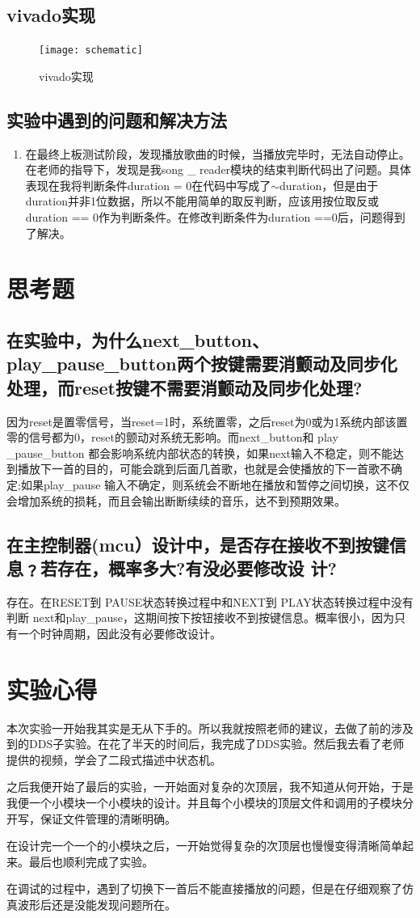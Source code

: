 \documentclass{../source/Experiment}
\begin{document}
        \subsection{vivado实现}
            \begin{figure}[H]
                \centering
                \texttt{[image: schematic]}
                \caption{vivado实现}
            \end{figure}
        \subsection{实验中遇到的问题和解决方法}
            \begin{enumerate}
                \item 在最终上板测试阶段，发现播放歌曲的时候，当播放完毕时，无法自动停止。在老师的指导下，发现是我song \_ reader模块的结束判断代码出了问题。具体表现在我将判断条件duration = 0在代码中写成了$\sim$duration，但是由于duration并非1位数据，所以不能用简单的取反判断，应该用按位取反或duration == 0作为判断条件。在修改判断条件为duration ==0后，问题得到了解决。
            \end{enumerate}
    \section{思考题}
        \subsection{在实验中，为什么next\_button、play\_pause\_button两个按键需要消颤动及同步化处理，而reset按键不需要消颤动及同步化处理?}
        因为reset是置零信号，当reset=1时，系统置零，之后reset为0或为1系统内部该置零的信号都为0，reset的颤动对系统无影响。而next\_button和 play \_pause\_button 都会影响系统内部状态的转换，如果next输入不稳定，则不能达到播放下一首的目的，可能会跳到后面几首歌，也就是会使播放的下一首歌不确定;如果play\_pause 输入不确定，则系统会不断地在播放和暂停之间切换，这不仅会增加系统的损耗，而且会输出断断续续的音乐，达不到预期效果。
        \subsection{在主控制器(mcu）设计中，是否存在接收不到按键信息﹖若存在，概率多大?有没必要修改设
        计?}
        存在。在RESET到 PAUSE状态转换过程中和NEXT到 PLAY状态转换过程中没有判断 next和play\_pause，这期间按下按钮接收不到按键信息。概率很小，因为只有一个时钟周期，因此没有必要修改设计。
    
    \section{实验心得}
    本次实验一开始我其实是无从下手的。所以我就按照老师的建议，去做了前的涉及到的DDS子实验。在花了半天的时间后，我完成了DDS实验。然后我去看了老师提供的视频，学会了二段式描述中状态机。

    之后我便开始了最后的实验，一开始面对复杂的次顶层，我不知道从何开始，于是我便一个小模块一个小模块的设计。并且每个小模块的顶层文件和调用的子模块分开写，保证文件管理的清晰明确。

    在设计完一个一个的小模块之后，一开始觉得复杂的次顶层也慢慢变得清晰简单起来。最后也顺利完成了实验。

    在调试的过程中，遇到了切换下一首后不能直接播放的问题，但是在仔细观察了仿真波形后还是没能发现问题所在。
\end{document}
